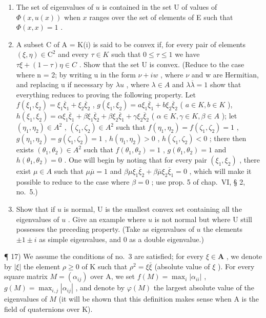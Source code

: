 \begin{enumerate}
\def\labelenumi{\alph{enumi})}
\item
  The set of eigenvalues of \(u\) is contained in the set U of values of \(\Phi(x, u(x))\) when \(x\) ranges over the set of elements of E such that \(\Phi(x, x) = 1\) .
\item
  A subset C of A = K(i) is said to be convex if, for every pair of elements \((\xi, \eta) \in \mathrm{C}^{2}\) and every \(\tau \in K\) such that \(0 \leqslant \tau \leqslant 1\) we have \(\tau\xi + (1 - \tau)\eta \in C\) . Show that the set U is convex. (Reduce to the case where n = 2; by writing u in the form \(\nu + iw\) , where \(\nu\) and w are Hermitian, and replacing u if necessary by \(\lambda u\) , where \(\lambda \in A\) and \(\lambda\overline{\lambda} = 1\) show that everything reduces to proving the following property. Let \(f(\xi_{1}, \xi_{2}) = \xi_{1}\overline{\xi}_{1} + \xi_{2}\overline{\xi}_{2}\) , \(g(\xi_{1}, \xi_{2}) = a\xi_{1}\overline{\xi}_{1} + b\xi_{2}\overline{\xi}_{2}\) ( \(a \in K, b \in K\) ), \(h(\xi_{1}, \xi_{2}) = \alpha\xi_{1}\overline{\xi}_{1} + \beta\xi_{1}\overline{\xi}_{2} + \beta\xi_{2}\overline{\xi}_{1} + \gamma\xi_{2}\overline{\xi}_{2}\) ( \(\alpha \in K, \gamma \in K, \beta \in A\) ); let \((\eta_{1}, \eta_{2}) \in A^{2}\) , \((\zeta_{1}, \zeta_{2}) \in A^{2}\) such that \(f(\eta_{1}, \eta_{2}) = f(\zeta_{1}, \zeta_{2}) = 1\) , \(g(\eta_{1}, \eta_{2}) = g(\zeta_{1}, \zeta_{2}) = 1\) , \(h(\eta_{1}, \eta_{2}) > 0\) , \(h(\zeta_{1}, \zeta_{2}) < 0\) ; there then exists \((\theta_{1}, \theta_{2}) \in A^{2}\) such that \(f(\theta_{1}, \theta_{2}) = 1\) , \(g(\theta_{1}, \theta_{2}) = 1\) and \(h(\theta_{1}, \theta_{2}) = 0\) . One will begin by noting that for every pair \((\xi_{1}, \xi_{2})\) , there exist \(\mu \in A\) such that \(\mu\overline{\mu} = 1\) and \(\beta\mu\xi_{1}\overline{\xi}_{2} + \beta\overline{\mu}\xi_{2}\overline{\xi}_{1} = 0\) , which will make it possible to reduce to the case where \(\beta = 0\) ; use prop. 5 of chap.~VI, § 2, no.~5.)
\item
  Show that if \(u\) is normal, U is the smallest convex set containing all the eigenvalues of \(u\) . Give an example where \(u\) is not normal but where U still possesses the preceding property. (Take as eigenvalues of \(u\) the elements \(\pm 1 \pm i\) as simple eigenvalues, and 0 as a double eigenvalue.)
\end{enumerate}

¶ 17) We assume the conditions of no.~3 are satisfied; for every \(\xi\in\mathbf{A}\) , we denote by \(|\xi|\) the element \(\rho\geqslant0\) of K such that \(\rho^{2}=\xi\bar{\xi}\) (absolute value of \(\xi\) ). For every square matrix \(M=(\alpha_{ij})\) over A, we set \(f(M)=\max_{i}|\alpha_{ii}|\) , \(g(M)=\max_{i,j}|\alpha_{ij}|\) , and denote by \(\varphi(M)\) the largest absolute value of the eigenvalues of \(M\) (it will be shown that this definition makes sense when A is the field of quaternions over K).

